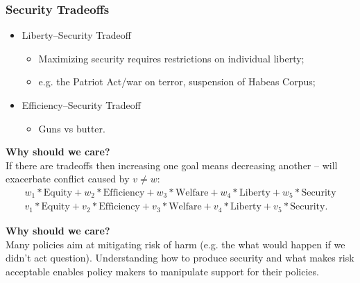 \documentclass[aspectratio=169]{beamer}
\theoremstyle{principle}
\begin{document}
\begin{frame}
\frametitle{Security Tradeoffs}
\begin{itemize}
\item Liberty--Security Tradeoff
\begin{itemize}
\item Maximizing security requires restrictions on individual liberty;
\item e.g. the Patriot Act/war on terror, suspension of Habeas Corpus;
\end{itemize}
\bigskip
\bigskip
\item Efficiency--Security Tradeoff
\begin{itemize}
\item Guns vs butter.
\end{itemize}
\end{itemize}

\end{frame}

\begin{frame}

\begin{center}
\Huge\textbf{Why should we care?}\\
\bigskip
\bigskip
\large If there are tradeoffs then increasing one goal means decreasing another -- will exacerbate conflict caused by $v\neq w$:
\begin{align*}
w_{1}*\mbox{Equity} + w_2*\mbox{Efficiency} + w_3*\mbox{Welfare} + w_4*\mbox{Liberty} + w_5*\mbox{Security}\\
v_{1}*\mbox{Equity} + v_2*\mbox{Efficiency} + v_3*\mbox{Welfare} + v_4*\mbox{Liberty} + v_5*\mbox{Security}.
\end{align*}
\end{center}

\end{frame}

\begin{frame}

\begin{center}
\Huge\textbf{Why should we care?}\\
\bigskip
\bigskip
\large Many policies aim at mitigating risk of harm (e.g. the what would happen if we didn't act question).  Understanding how to produce security and what makes risk acceptable enables policy makers to manipulate support for their policies.
\end{center}

\end{frame}
\end{document}
